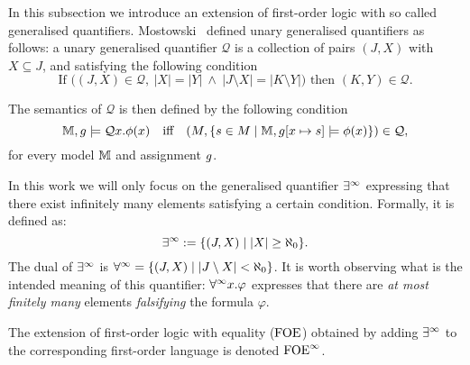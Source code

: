 

In this subsection we introduce an extension of first-order logic with so called generalised quantifiers.
%
Mostowski~\cite{Mostowski1957} defined unary generalised quantifiers as follows: a unary generalised quantifier ${\mathcal Q}$ is a collection of pairs $(J, X)$ with $X \subseteq J$, and satisfying the following condition
%
\[
\text{If } \big( (J,X)\in {\mathcal Q}, \ |X|=|Y| \ \land \ | J \setminus X|=|K \setminus Y|\big) \text{ then } (K,Y)\in {\mathcal Q}.
\]

\noindent The semantics of ${\mathcal Q}$ is then defined by the following condition
\[
\npmodel,\ass \models {\mathcal Q}x. \phi(x) \quad\text{iff}\quad (\npmoddom,\{s\in\npmoddom \mid \npmodel,\ass[x\mapsto s] \models \phi(x) \}) \in {\mathcal Q},
\]
%
for every model $\mathbb{M}$ and assignment $g$.

In this work we will only focus on the generalised quantifier $\exists^\infty$ expressing that there exist infinitely many elements satisfying a certain condition. Formally, it is defined as:
%
\[ \exists^\infty := \{(J,X) \mid |X| \geq \aleph_0\}.\]
%
The dual of $\exists^\infty$ is $\forall^\infty =\{(J,X) \mid |J\setminus X| < \aleph_0\}$. It is worth observing what is the intended meaning of this quantifier: $\forall^\infty x.\varphi$ expresses that there are \emph{at most finitely many} elements \emph{falsifying} the formula $\varphi$.


\begin{definition}
The extension of first-order logic with equality ($\mathrm{FOE}$) 
obtained by adding $\exists^\infty$ to the corresponding first-order language is denoted $\mathrm{FOE}^{\infty}$.
\end{definition}
